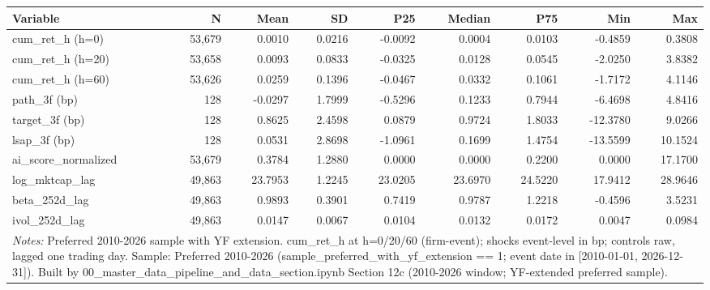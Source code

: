 \begin{tabular}{lrrrrrrrr}
\toprule
Variable & N & Mean & SD & P25 & Median & P75 & Min & Max \\
\midrule
cum\_ret\_h (h=0) & 53,679 & 0.0010 & 0.0216 & -0.0092 & 0.0004 & 0.0103 & -0.4859 & 0.3808 \\
cum\_ret\_h (h=20) & 53,658 & 0.0093 & 0.0833 & -0.0325 & 0.0128 & 0.0545 & -2.0250 & 3.8382 \\
cum\_ret\_h (h=60) & 53,626 & 0.0259 & 0.1396 & -0.0467 & 0.0332 & 0.1061 & -1.7172 & 4.1146 \\
path\_3f (bp) & 128 & -0.0297 & 1.7999 & -0.5296 & 0.1233 & 0.7944 & -6.4698 & 4.8416 \\
target\_3f (bp) & 128 & 0.8625 & 2.4598 & 0.0879 & 0.9724 & 1.8033 & -12.3780 & 9.0266 \\
lsap\_3f (bp) & 128 & 0.0531 & 2.8698 & -1.0961 & 0.1699 & 1.4754 & -13.5599 & 10.1524 \\
ai\_score\_normalized & 53,679 & 0.3784 & 1.2880 & 0.0000 & 0.0000 & 0.2200 & 0.0000 & 17.1700 \\
log\_mktcap\_lag & 49,863 & 23.7953 & 1.2245 & 23.0205 & 23.6970 & 24.5220 & 17.9412 & 28.9646 \\
beta\_252d\_lag & 49,863 & 0.9893 & 0.3901 & 0.7419 & 0.9787 & 1.2218 & -0.4596 & 3.5231 \\
ivol\_252d\_lag & 49,863 & 0.0147 & 0.0067 & 0.0104 & 0.0132 & 0.0172 & 0.0047 & 0.0984 \\
\bottomrule
\multicolumn{9}{p{0.95\linewidth}}{\footnotesize \textit{Notes:} Preferred 2010-2026 sample with YF extension. cum\_ret\_h at h=0/20/60 (firm-event); shocks event-level in bp; controls raw, lagged one trading day. Sample: Preferred 2010-2026 (sample\_preferred\_with\_yf\_extension == 1; event date in [2010-01-01, 2026-12-31]). Built by 00\_master\_data\_pipeline\_and\_data\_section.ipynb Section 12c (2010-2026 window; YF-extended preferred sample).} \\
\end{tabular}
